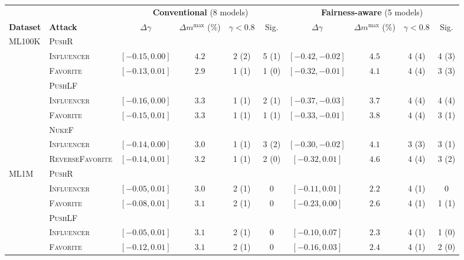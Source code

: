 \begin{table}
\begin{adjustbox}{max width=\textwidth}
\centering
\begin{tabular}{l l cccc cccc}
\toprule
 & & \multicolumn{4}{c}{\textbf{Conventional} (8 models)} & \multicolumn{4}{c}{\textbf{Fairness-aware} (5 models)} \\
\cmidrule(lr){3-6}\cmidrule(lr){7-10}
\textbf{Dataset} & \textbf{Attack} & $\Delta\gamma$ & $\Delta m^{\max}$ (\%) & $\gamma<0.8$ & Sig. & $\Delta\gamma$ & $\Delta m^{\max}$ (\%) & $\gamma<0.8$ & Sig. \\
\midrule
\multirow{9}{*}{ML100K} & \multicolumn{9}{l}{\textsc{PushR}} \\
 & \quad \textsc{Influencer} & $[-0.15, 0.00]$ & $4.2$ & 2 (2) & 5 (1) & $[-0.42, -0.02]$ & $4.5$ & 4 (4) & 4 (3) \\
 & \quad \textsc{Favorite} & $[-0.13, 0.01]$ & $2.9$ & 1 (1) & 1 (0) & $[-0.32, -0.01]$ & $4.1$ & 4 (4) & 3 (3) \\
\addlinespace[2pt]
 & \multicolumn{9}{l}{\textsc{PushLF}} \\
 & \quad \textsc{Influencer} & $[-0.16, 0.00]$ & $3.3$ & 1 (1) & 2 (1) & $[-0.37, -0.03]$ & $3.7$ & 4 (4) & 4 (4) \\
 & \quad \textsc{Favorite} & $[-0.15, 0.01]$ & $3.3$ & 1 (1) & 1 (1) & $[-0.33, -0.01]$ & $3.8$ & 4 (4) & 3 (1) \\
\cmidrule(lr){2-10}
 & \multicolumn{9}{l}{\textsc{NukeF}} \\
 & \quad \textsc{Influencer} & $[-0.14, 0.00]$ & $3.0$ & 1 (1) & 3 (2) & $[-0.30, -0.02]$ & $4.1$ & 3 (3) & 3 (1) \\
 & \quad \textsc{ReverseFavorite} & $[-0.14, 0.01]$ & $3.2$ & 1 (1) & 2 (0) & $[-0.32, 0.01]$ & $4.6$ & 4 (4) & 3 (2) \\
\cmidrule(lr){1-10}
\multirow{9}{*}{ML1M} & \multicolumn{9}{l}{\textsc{PushR}} \\
 & \quad \textsc{Influencer} & $[-0.05, 0.01]$ & $3.0$ & 2 (1) & 0 & $[-0.11, 0.01]$ & $2.2$ & 4 (1) & 0 \\
 & \quad \textsc{Favorite} & $[-0.08, 0.01]$ & $3.1$ & 2 (1) & 0 & $[-0.23, 0.00]$ & $2.6$ & 4 (1) & 1 (1) \\
\addlinespace[2pt]
 & \multicolumn{9}{l}{\textsc{PushLF}} \\
 & \quad \textsc{Influencer} & $[-0.05, 0.01]$ & $3.1$ & 2 (1) & 0 & $[-0.10, 0.07]$ & $2.3$ & 4 (1) & 1 (0) \\
 & \quad \textsc{Favorite} & $[-0.12, 0.01]$ & $3.1$ & 2 (1) & 0 & $[-0.16, 0.03]$ & $2.4$ & 4 (1) & 2 (0) \\

\end{tabular}
\end{adjustbox}
\end{table}
